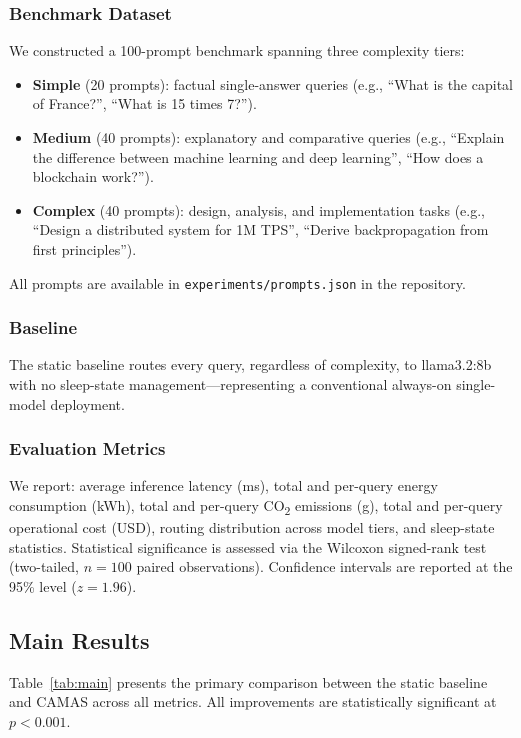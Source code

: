 \documentclass[journal]{IEEEtran}
\begin{document}
\subsubsection{Benchmark Dataset}
We constructed a 100-prompt benchmark spanning three complexity tiers:
\begin{itemize}
    \item \textbf{Simple} (20 prompts): factual single-answer queries
          (e.g., ``What is the capital of France?'', ``What is 15 times 7?'').
    \item \textbf{Medium} (40 prompts): explanatory and comparative queries
          (e.g., ``Explain the difference between machine learning and deep
          learning'', ``How does a blockchain work?'').
    \item \textbf{Complex} (40 prompts): design, analysis, and implementation
          tasks (e.g., ``Design a distributed system for 1M TPS'', ``Derive
          backpropagation from first principles'').
\end{itemize}
All prompts are available in \texttt{experiments/prompts.json} in the
repository.

\subsubsection{Baseline}
The static baseline routes every query, regardless of complexity, to
llama3.2:8b with no sleep-state management—representing a conventional
always-on single-model deployment.

\subsubsection{Evaluation Metrics}
We report: average inference latency (ms), total and per-query energy
consumption (kWh), total and per-query CO\textsubscript{2} emissions (g),
total and per-query operational cost (USD), routing distribution across model
tiers, and sleep-state statistics. Statistical significance is assessed via
the Wilcoxon signed-rank test (two-tailed, $n=100$ paired observations).
Confidence intervals are reported at the 95\% level ($z = 1.96$).

\subsection{Main Results}

Table~\ref{tab:main} presents the primary comparison between the static
baseline and CAMAS across all metrics. All improvements are statistically
significant at $p < 0.001$.
\end{document}
